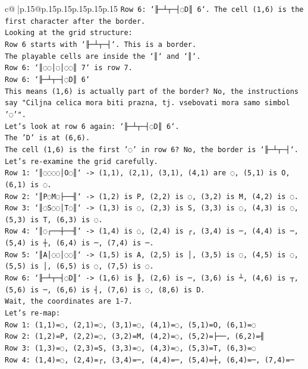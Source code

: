 \documentclass{article}
\begin{document}
{\begin{supertabular}{c@{$\;$}|p{.15\linewidth}@{}p{.15\linewidth}p{.15\linewidth}p{.15\linewidth}p{.15\linewidth}p{.15\linewidth}}
{{{\texttt{Row 6: `╟─┴┬─┤◌D║ 6`. The cell (1,6) is the first character after the border.} \\
\texttt{Looking at the grid structure:} \\
\texttt{Row 6 starts with `╟─┴┬─┤`. This is a border.} \\
\texttt{The playable cells are inside the `║` and `║`.} \\
\texttt{Row 6: `║◌◌│◌│◌◌║ 7` is row 7.} \\
\texttt{Row 6: `╟─┴┬─┤◌D║ 6`} \\
\texttt{This means (1,6) is actually part of the border? No, the instructions say "Ciljna celica mora biti prazna, tj. vsebovati mora samo simbol '◌'".} \\
\texttt{Let's look at row 6 again: `╟─┴┬─┤◌D║ 6`.} \\
\texttt{The 'D' is at (6,6).} \\
\texttt{The cell (1,6) is the first '◌' in row 6? No, the border is `╟─┴┬─┤`.} \\
\texttt{Let's re{-}examine the grid carefully.} \\
\texttt{Row 1: `║◌◌◌◌│O◌║` {-}> (1,1), (2,1), (3,1), (4,1) are ◌, (5,1) is O, (6,1) is ◌.} \\
\texttt{Row 2: `║P◌M◌├──╢` {-}> (1,2) is P, (2,2) is ◌, (3,2) is M, (4,2) is ◌.} \\
\texttt{Row 3: `║◌S◌◌│T◌║` {-}> (1,3) is ◌, (2,3) is S, (3,3) is ◌, (4,3) is ◌, (5,3) is T, (6,3) is ◌.} \\
\texttt{Row 4: `║◌┌──┼──╢` {-}> (1,4) is ◌, (2,4) is ┌, (3,4) is ─, (4,4) is ─, (5,4) is ┼, (6,4) is ─, (7,4) is ─.} \\
\texttt{Row 5: `║A│◌◌│◌◌║` {-}> (1,5) is A, (2,5) is │, (3,5) is ◌, (4,5) is ◌, (5,5) is │, (6,5) is ◌, (7,5) is ◌.} \\
\texttt{Row 6: `╟─┴┬─┤◌D║` {-}> (1,6) is ╟, (2,6) is ─, (3,6) is ┴, (4,6) is ┬, (5,6) is ─, (6,6) is ┤, (7,6) is ◌, (8,6) is D.} \\
\texttt{Wait, the coordinates are 1{-}7.} \\
\texttt{Let's re{-}map:} \\
\texttt{Row 1: (1,1)=◌, (2,1)=◌, (3,1)=◌, (4,1)=◌, (5,1)=O, (6,1)=◌} \\
\texttt{Row 2: (1,2)=P, (2,2)=◌, (3,2)=M, (4,2)=◌, (5,2)=├──, (6,2)=╢} \\
\texttt{Row 3: (1,3)=◌, (2,3)=S, (3,3)=◌, (4,3)=◌, (5,3)=T, (6,3)=◌} \\
\texttt{Row 4: (1,4)=◌, (2,4)=┌, (3,4)=─, (4,4)=─, (5,4)=┼, (6,4)=─, (7,4)=─} \\
}}}
\end{supertabular}}
\end{document}
